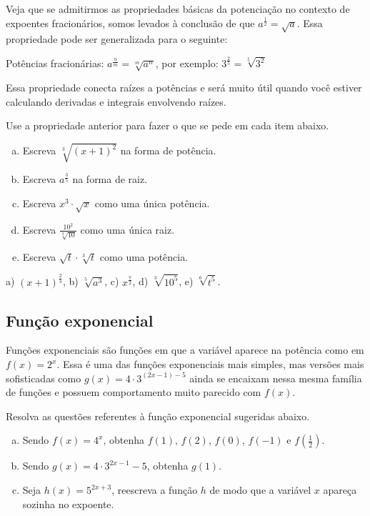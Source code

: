 \documentclass[main.tex]{subfiles}
\begin{document}
Veja que se admitirmos as propriedades básicas da potenciação no contexto de expoentes fracionários, somos levados à conclusão de que $a^\frac{1}{2} = \sqrt{a}$. Essa propriedade pode ser generalizada para o seguinte:

\begin{caixaExemplo}
 Potências fracionárias: $a^\frac{n}{m}  = \sqrt[m]{a^n}$, por exemplo: $3^{\frac{2}{5}}=\sqrt[5]{3^2}$
\end{caixaExemplo}

Essa propriedade conecta raízes a potências e será muito útil quando você estiver calculando derivadas e integrais envolvendo raízes.

\begin{questao}
Use a propriedade anterior para fazer o que se pede em cada item abaixo.
\begin{enumerate}[a)]
\item Escreva $\sqrt[3]{(x+1)^2}$ na forma de potência.
\item Escreva  $a^{\frac{3}{5}}$ na forma de raiz.
\item Escreva $x^3 \cdot \sqrt{x}$ como uma única potência.
\item Escreva $\frac{10^2}{\sqrt[3]{10}}$ como uma única raiz.
\item Escreva $\sqrt{t} \cdot \sqrt[3]{t}$ como uma potência.
\end{enumerate}
\end{questao}

\begin{gabarito}
	\begin{gabaritoQuestao}
		a) $(x+1)^{\frac{2}{3}}$, b) $\sqrt[5]{a^3}$, c) $x^{\frac{7}{2}}$, d) $\sqrt[3]{10^5}$, e) $\sqrt[6]{t^5}$.
	\end{gabaritoQuestao}
\end{gabarito}

\subsection*{Função exponencial}

Funções exponenciais são funções em que a variável aparece na potência como em $f(x)=2^x$. Essa é uma das funções exponenciais mais simples, mas versões mais sofisticadas como $g(x)=4 \cdot 3^{(2x-1)-5}$ ainda se encaixam nessa mesma família de funções e possuem comportamento muito parecido com $f(x)$.

\begin{questao}
Resolva as questões referentes à função exponencial sugeridas abaixo.
\begin{enumerate}[a)]
\item Sendo $f(x)=4^x$, obtenha $f(1)$, $f(2)$, $f(0)$, $f(-1)$ e $f(\frac{1}{2})$.
\item Sendo $g(x)=4 \cdot 3^{2x-1}-5$, obtenha $g(1)$.
\item Seja $h(x)=5^{2x+3}$, reescreva a função $h$ de modo que a variável $x$ apareça sozinha no expoente.
\end{enumerate}
\end{questao}
\end{document}
